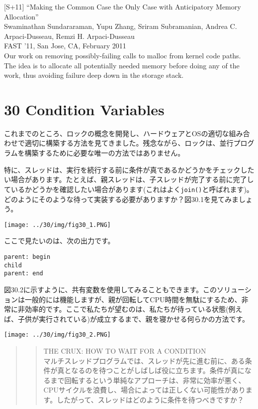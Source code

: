 {[}S+11{]} ``Making the Common Case the Only Case with Anticipatory
Memory Allocation''\\
Swaminathan Sundararaman, Yupu Zhang, Sriram Subramanian, Andrea C.
Arpaci-Dusseau, Remzi H. Arpaci-Dusseau\\
FAST '11, San Jose, CA, February 2011\\
Our work on removing possibly-failing calls to malloc from kernel code
paths. The idea is to allocate all potentially needed memory before
doing any of the work, thus avoiding failure deep down in the storage
stack.

\hypertarget{condition-variables-1}{%
\section*{30 Condition Variables}\label{condition-variables-1}}

これまでのところ、ロックの概念を開発し、ハードウェアとOSの適切な組み合わせで適切に構築する方法を見てきました。残念ながら、ロックは、並行プログラムを構築するために必要な唯一の方法ではありません。

特に、スレッドは、実行を続行する前に条件が真であるかどうかをチェックしたい場合があります。たとえば、親スレッドは、子スレッドが完了する前に完了しているかどうかを確認したい場合があります(これはよく\texttt{join()}と呼ばれます)。どのようにそのような待って実装する必要がありますか？図30.1を見てみましょう。

\texttt{[image: ../30/img/fig30\_1.PNG]}

ここで見たいのは、次の出力です。

\begin{verbatim}
parent: begin
child
parent: end
\end{verbatim}

図30.2に示すように、共有変数を使用してみることもできます。このソリューションは一般的には機能しますが、親が回転してCPU時間を無駄にするため、非常に非効率的です。ここで私たちが望むのは、私たちが待っている状態(例えば、子供が実行されている)が成立するまで、親を寝かせる何らかの方法です。

\texttt{[image: ../30/img/fig30\_2.PNG]}

\begin{quote}
\begin{quote}
THE CRUX: HOW TO WAIT FOR A CONDITION\\
マルチスレッドプログラムでは、スレッドが先に進む前に、ある条件が真となるのを待つことがしばしば役に立ちます。条件が真になるまで回転するという単純なアプローチは、非常に効率が悪く、CPUサイクルを浪費し、場合によっては正しくない可能性があります。したがって、スレッドはどのように条件を待つべきですか？
\end{quote}
\end{quote}

